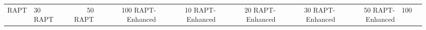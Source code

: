 \begin{table}
\begin{tabular}{llrrrrrrrr}
RAPT & 30%
RAPT & 50%
RAPT & 100%
RAPT-Enhanced & 10%
RAPT-Enhanced & 20%
RAPT-Enhanced & 30%
RAPT-Enhanced & 50%
RAPT-Enhanced & 100%
\bottomrule
\end{tabular}
\end{table}
